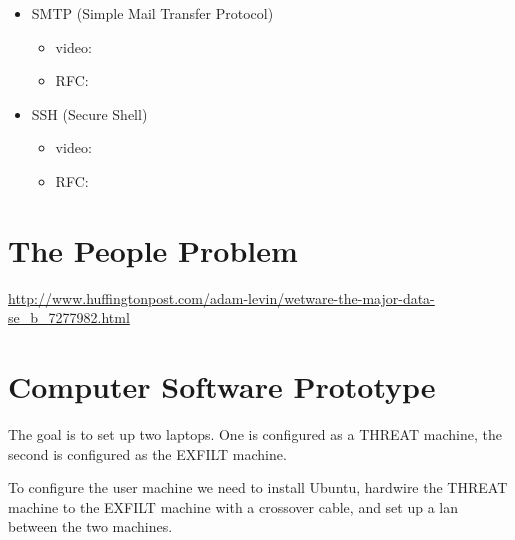 \documentclass[dvipdfm]{book}
\begin{document}
\begin{itemize}
\item{SMTP (Simple Mail Transfer Protocol)}
\begin{itemize}
\item video:
\item RFC:
\end{itemize}

\item{SSH (Secure Shell)}
\begin{itemize}
\item video:
\item RFC:
\end{itemize}

\end{itemize}

\chapter{The People Problem}
\url{http://www.huffingtonpost.com/adam-levin/wetware-the-major-data-se_b_7277982.html}

\chapter{Computer Software Prototype}

The goal is to set up two laptops. One is configured as a THREAT
machine, the second is configured as the EXFILT machine.

To configure the user machine we need to install Ubuntu,
hardwire the THREAT machine to the EXFILT machine with a
crossover cable, and set up a lan between the two machines.
\end{document}
